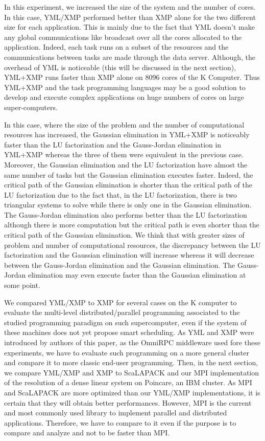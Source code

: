 In this experiment, we increased the size of the system and the number of cores.
In this case, YML/XMP performed better than XMP alone for the two different size for each application.
This is mainly due to the fact that YML doesn't make any global communications like broadcast over all the cores allocated to the application.
Indeed, each task runs on a subset of the resources and the communications between tasks are made through the data server.
Although, the overhead of YML is noticeable (this will be discussed in the next section), YML+XMP runs faster than XMP alone on 8096 cores of the K Computer.
Thus YML+XMP and the task programming languages may be a good solution to develop and execute complex applications on huge numbers of cores on large super-computers.

In this case, where the size of the problem and the number of computational resources has increased, the Gaussian elimination in YML+XMP is noticeably faster than the LU factorization and the Gauss-Jordan elimination in YML+XMP whereas the three of them were equivalent in the previous case.
Moreover, the Gaussian elimination and the LU factorization have almost the same number of tasks but the Gaussian elimination executes faster.
Indeed, the critical path of the Gaussian elimination is shorter than the critical path of the LU factorization due to the fact that, in the LU factorization, there is two triangular systems to solve while there is only one in the Gaussian elimination.
The Gauss-Jordan elimination also performs better than the LU factorization although there is more computation but the critical path is even shorter than the critical path of the Gaussian elimination.
We think that with greater sizes of problem and number of computational resources, the discrepancy between the LU factorization and the Gaussian elimination will increase whereas it will decrease between the Gauss-Jordan elimination and the Gaussian elimination.
The Gauss-Jordan elimination may even execute faster than the Gaussian elimination at some point.


We compared YML/XMP to XMP for several cases on the K computer to evaluate the multi-level distributed/parallel programming associated to the studied programming paradigm on such supercomputer, even if the system of these machines does not yet propose smart scheduling.
As YML and XMP were introduced by authors of this paper, as the OmniRPC middleware used fore these experiments, we have to evaluate such programming on a more general cluster and compare it to more classic end-user programming.
Then, in the next section, we compare YML/XMP and XMP to ScaLAPACK and our MPI implementation of the resolution of a dense linear system on Poincare, an IBM cluster.
As MPI and ScaLAPACK are more optimized than our YML/XMP implementations, it is certain that they will obtain better performances.
However, MPI is the current and most commonly used library to implement parallel and distributed applications.
Therefore, we have to compare to it even if the purpose is to compare and analyze and not to be faster than MPI.



